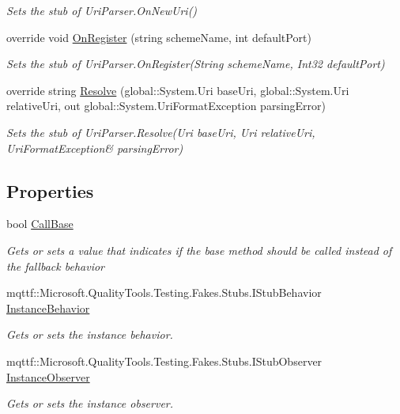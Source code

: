 \begin{DoxyCompactItemize}
\begin{DoxyCompactList}\small\item\em Sets the stub of Uri\-Parser.\-On\-New\-Uri()\end{DoxyCompactList}\item 
override void \hyperlink{class_system_1_1_fakes_1_1_stub_generic_uri_parser_af63d9e9e95c77b786304f23798e8df3c}{On\-Register} (string scheme\-Name, int default\-Port)
\begin{DoxyCompactList}\small\item\em Sets the stub of Uri\-Parser.\-On\-Register(\-String scheme\-Name, Int32 default\-Port)\end{DoxyCompactList}\item 
override string \hyperlink{class_system_1_1_fakes_1_1_stub_generic_uri_parser_a70123ecdf1014b72bec653f435251608}{Resolve} (global\-::\-System.\-Uri base\-Uri, global\-::\-System.\-Uri relative\-Uri, out global\-::\-System.\-Uri\-Format\-Exception parsing\-Error)
\begin{DoxyCompactList}\small\item\em Sets the stub of Uri\-Parser.\-Resolve(Uri base\-Uri, Uri relative\-Uri, Uri\-Format\-Exception\& parsing\-Error)\end{DoxyCompactList}\end{DoxyCompactItemize}
\subsection*{Properties}
\begin{DoxyCompactItemize}
\item 
bool \hyperlink{class_system_1_1_fakes_1_1_stub_generic_uri_parser_a0331b76f773aca83c556dba9250e125d}{Call\-Base}
\begin{DoxyCompactList}\small\item\em Gets or sets a value that indicates if the base method should be called instead of the fallback behavior\end{DoxyCompactList}\item 
mqttf\-::\-Microsoft.\-Quality\-Tools.\-Testing.\-Fakes.\-Stubs.\-I\-Stub\-Behavior \hyperlink{class_system_1_1_fakes_1_1_stub_generic_uri_parser_a9869f7bc8bf42a907729a2815cfa8524}{Instance\-Behavior}
\begin{DoxyCompactList}\small\item\em Gets or sets the instance behavior.\end{DoxyCompactList}\item 
mqttf\-::\-Microsoft.\-Quality\-Tools.\-Testing.\-Fakes.\-Stubs.\-I\-Stub\-Observer \hyperlink{class_system_1_1_fakes_1_1_stub_generic_uri_parser_a5939ff1dcadf8fc999d8d827e71765d2}{Instance\-Observer}
\begin{DoxyCompactList}\small\item\em Gets or sets the instance observer.\end{DoxyCompactList}\end{DoxyCompactItemize}


